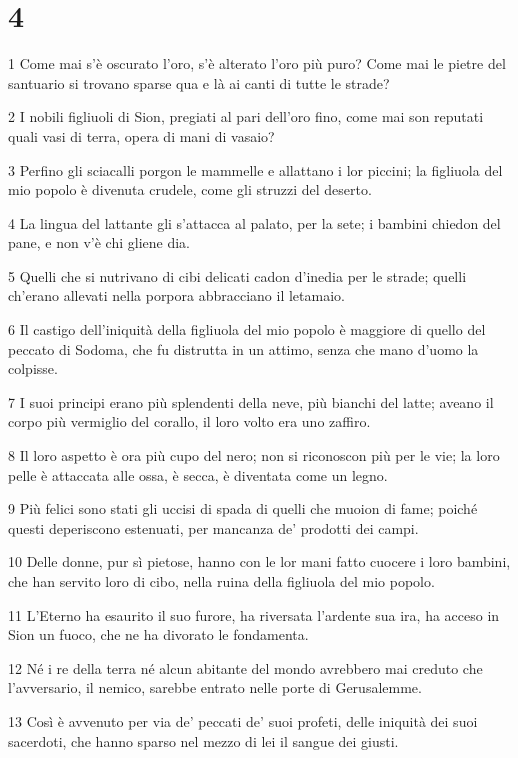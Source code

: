 \chapter{4}

\par 1 Come mai s'è oscurato l'oro, s'è alterato l'oro più puro? Come mai le pietre del santuario si trovano sparse qua e là ai canti di tutte le strade?
\par 2 I nobili figliuoli di Sion, pregiati al pari dell'oro fino, come mai son reputati quali vasi di terra, opera di mani di vasaio?
\par 3 Perfino gli sciacalli porgon le mammelle e allattano i lor piccini; la figliuola del mio popolo è divenuta crudele, come gli struzzi del deserto.
\par 4 La lingua del lattante gli s'attacca al palato, per la sete; i bambini chiedon del pane, e non v'è chi gliene dia.
\par 5 Quelli che si nutrivano di cibi delicati cadon d'inedia per le strade; quelli ch'erano allevati nella porpora abbracciano il letamaio.
\par 6 Il castigo dell'iniquità della figliuola del mio popolo è maggiore di quello del peccato di Sodoma, che fu distrutta in un attimo, senza che mano d'uomo la colpisse.
\par 7 I suoi principi erano più splendenti della neve, più bianchi del latte; aveano il corpo più vermiglio del corallo, il loro volto era uno zaffiro.
\par 8 Il loro aspetto è ora più cupo del nero; non si riconoscon più per le vie; la loro pelle è attaccata alle ossa, è secca, è diventata come un legno.
\par 9 Più felici sono stati gli uccisi di spada di quelli che muoion di fame; poiché questi deperiscono estenuati, per mancanza de' prodotti dei campi.
\par 10 Delle donne, pur sì pietose, hanno con le lor mani fatto cuocere i loro bambini, che han servito loro di cibo, nella ruina della figliuola del mio popolo.
\par 11 L'Eterno ha esaurito il suo furore, ha riversata l'ardente sua ira, ha acceso in Sion un fuoco, che ne ha divorato le fondamenta.
\par 12 Né i re della terra né alcun abitante del mondo avrebbero mai creduto che l'avversario, il nemico, sarebbe entrato nelle porte di Gerusalemme.
\par 13 Così è avvenuto per via de' peccati de' suoi profeti, delle iniquità dei suoi sacerdoti, che hanno sparso nel mezzo di lei il sangue dei giusti.
